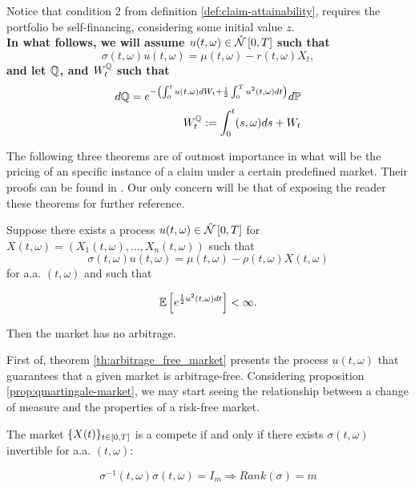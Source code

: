 \documentclass[../TGMAFFIRO.tex]{subfiles}
\begin{document}
Notice that condition 2 from definition \ref{def:claim-attainability}, requires the portfolio  be self-financing, considering some initial value $z$.\\

\textbf{
In what follows, we will assume $u(t,\omega) \in \hat{\mathcal{N}}\left[0, T\right]$ such that
\begin{equation}\label{eq:condition_change_measure}
	\sigma(t,\omega) u(t,\omega) = \mu(t,\omega) - r(t,\omega) X_t,
\end{equation}
and let $\mathbb{Q}$, and $W_t^{\mathbb{Q}}$ such that
\begin{align}
  d\mathbb{Q} = e^{-\left(\int_0^t u(t,\omega) dW_t + \frac{1}{2}\int_0^T u^2(t,\omega) dt\right)} d\mathbb{P} \label{eq:emmq} \\
  W^{\mathbb{Q}}_t := \int_0^t (s,\omega) ds + W_t
\end{align}
}

The following three theorems are of outmost importance in what will be the pricing of an specific instance of a claim under a certain predefined market. Their proofs can be found in . Our only concern will be that of exposing the reader these theorems for further reference. 

\begin{theorem}\label{th:arbitrage_free_market}
	Suppose there exists a process $u(t,\omega) \in \hat{\mathcal{N}}\left[0, T\right]$ for $X(t,\omega) = (X_1(t,\omega), \ldots, X_n(t,\omega))$ such that
	\begin{equation}
		\sigma(t,\omega) u(t,\omega) = \mu(t, \omega) - \rho(t,\omega) X(t,\omega)
	\end{equation}
	for a.a. $(t,\omega)$ and such that
	
	\begin{equation}\label{eq:condition_arbitrage_free_market}
		\mathbb{E}\left[e^{\frac{1}{2}u^2(t,\omega) dt}\right] < \infty.
	\end{equation}
	
	Then the market has no arbitrage.
\end{theorem}

First of, theorem \ref{th:arbitrage_free_market} presents the process $u(t,\omega)$ that guarantees that a given market is arbitrage-free. Considering proposition \ref{prop:qmartingale-market}, we may start seeing the relationship between a change of measure and the properties of a risk-free market.

\begin{theorem}\label{th:complete_market}
	The market $\{X(t)\}_{t\in[0,T]}$ is a compete if and only if there exists $\sigma(t,\omega)$ invertible for a.a. $(t,\omega)$:
		
	\begin{equation}
		\sigma^{-1}(t,\omega) \sigma(t,\omega) = I_m \Rightarrow Rank(\sigma) = m
	\end{equation}
\end{theorem}
\end{document}
